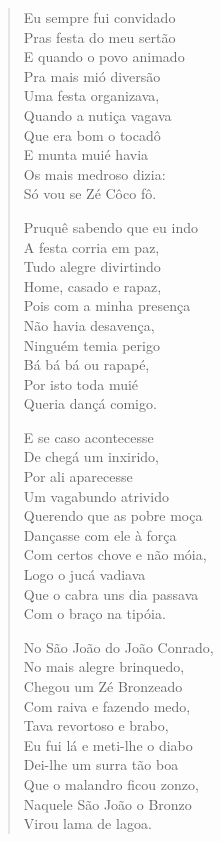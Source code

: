 \begin{verse}
Eu sempre fui convidado\\
Pras festa do meu sertão\\
E quando o povo animado\\
Pra mais mió diversão\\
Uma festa organizava,\\
Quando a nutiça vagava\\
Que era bom o tocadô\\
E munta muié havia\\
Os mais medroso dizia:\\
Só vou se Zé Côco fô.

Pruquê sabendo que eu indo\\
A festa corria em paz,\\
Tudo alegre divirtindo\\
Home, casado e rapaz,\\
Pois com a minha presença\\
Não havia desavença,\\
Ninguém temia perigo\\
Bá bá bá ou rapapé,\\
Por isto toda muié\\
Queria dançá comigo.

E se caso acontecesse\\
De chegá um inxirido,\\
Por ali aparecesse\\
Um vagabundo atrivido\\
Querendo que as pobre moça\\
Dançasse com ele à força\\
Com certos chove e não móia,\\
Logo o jucá vadiava\\
Que o cabra uns dia passava\\
Com o braço na tipóia.

No São João do João Conrado,\\
No mais alegre brinquedo,\\
Chegou um Zé Bronzeado\\
Com raiva e fazendo medo,\\
Tava revortoso e brabo,\\
Eu fui lá e meti-lhe o diabo\\
Dei-lhe um surra tão boa\\
Que o malandro ficou zonzo,\\
Naquele São João o Bronzo\\
Virou lama de lagoa.


\end{verse}
